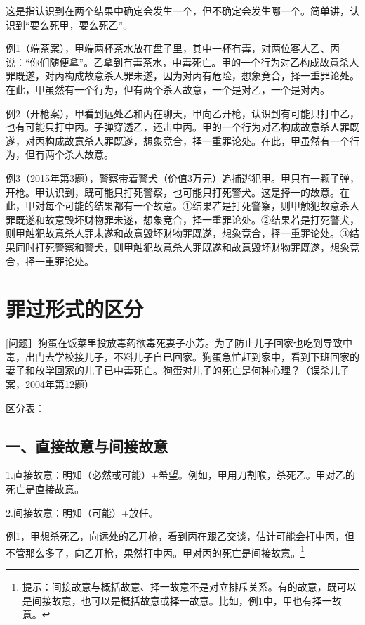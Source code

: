 这是指认识到在两个结果中确定会发生一个，但不确定会发生哪一个。简单讲，认识到“要么死甲，要么死乙”。

例1（端茶案），甲端两杯茶水放在盘子里，其中一杯有毒，对两位客人乙、丙说：“你们随便拿”。乙拿到有毒茶水，中毒死亡。甲的一个行为对乙构成故意杀人罪既遂，对丙构成故意杀人罪未遂，因为对丙有危险，想象竞合，择一重罪论处。在此，甲虽然有一个行为，但有两个杀人故意，一个是对乙，一个是对丙。

例2（开枪案），甲看到远处乙和丙在聊天，甲向乙开枪，认识到有可能只打中乙，也有可能只打中丙。子弹穿透乙，还击中丙。甲的一个行为对乙构成故意杀人罪既遂，对丙构成故意杀人罪既遂，想象竞合，择一重罪论处。在此，甲虽然有一个行为，但有两个杀人故意。

例3（2015年第3题），警察带着警犬（价值3万元）追捕逃犯甲。甲只有一颗子弹，开枪。甲认识到，既可能只打死警察，也可能只打死警犬。这是择一的故意。在此，甲对每个可能的结果都有一个故意。①结果若是打死警察，则甲触犯故意杀人罪既遂和故意毁坏财物罪未遂，想象竞合，择一重罪论处。②结果若是打死警犬，则甲触犯故意杀人罪未遂和故意毁坏财物罪既遂，想象竞合，择一重罪论处。③结果同时打死警察和警犬，则甲触犯故意杀人罪既遂和故意毁坏财物罪既遂，想象竞合，择一重罪论处。

\section{罪过形式的区分}

[问题］狗蛋在饭菜里投放毒药欲毒死妻子小芳。为了防止儿子回家也吃到导致中毒，出门去学校接儿子，不料儿子自已回家。狗蛋急忙赶到家中，看到下班回家的妻子和放学回家的儿子已中毒死亡。狗蛋对儿子的死亡是何种心理？（误杀儿子案，2004年第12题）

区分表：


\subsection*{一、直接故意与间接故意}

1.直接故意：明知（必然或可能）+希望。例如，甲用刀割喉，杀死乙。甲对乙的死亡是直接故意。

2.间接故意：明知（可能）+放任。

例1，甲想杀死乙，向远处的乙开枪，看到丙在跟乙交谈，估计可能会打中丙，但不管那么多了，向乙开枪，果然打中丙。甲对丙的死亡是间接故意。\footnote{提示：间接故意与概括故意、择一故意不是对立排斥关系。有的故意，既可以是间接故意，也可以是概括故意或择一故意。比如，例1中，甲也有择一故意。}

